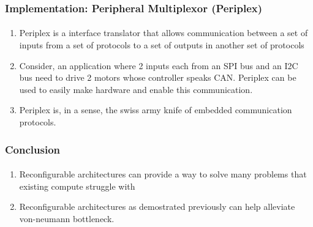 \documentclass{beamer}
\begin{document}
\begin{frame}[fragile]
  \frametitle{Implementation: Peripheral Multiplexor (Periplex)}
  \framesubtitle{}

  \begin{enumerate}
    \item Periplex is a interface translator that allows communication
      between a set of inputs from a set of protocols to a set of outputs
      in another set of protocols
    \item Consider, an application where 2 inputs each from an SPI bus and an
      I2C bus need to drive 2 motors whose controller speaks CAN. Periplex can
      be used to easily make hardware and enable this communication.
    \item Periplex is, in a sense, the swiss army knife of embedded
      communication protocols.
  \end{enumerate}
\end{frame}

\begin{frame}[fragile]
  \frametitle{Conclusion}
  \framesubtitle{}

  \begin{enumerate}
    \item Reconfigurable architectures can provide a way to solve many problems
      that existing compute struggle with
    \item Reconfigurable architectures as demostrated previously can help
      alleviate von-neumann bottleneck.
  \end{enumerate}
\end{frame}
\end{document}
